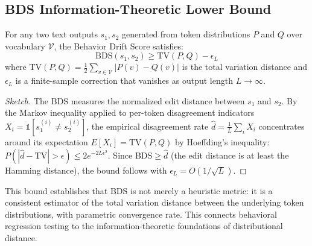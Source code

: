 
\subsection{BDS Information-Theoretic Lower Bound}

\begin{theorem}
\label{thm:bds_bound}
For any two text outputs $s_1, s_2$ generated from token distributions
$P$ and $Q$ over vocabulary $\mathcal{V}$, the Behavior Drift Score
satisfies:
\begin{equation}
\mathrm{BDS}(s_1, s_2) \geq \mathrm{TV}(P, Q) - \epsilon_L
\end{equation}
where $\mathrm{TV}(P, Q) = \frac{1}{2}\sum_{v \in \mathcal{V}} |P(v) - Q(v)|$
is the total variation distance and $\epsilon_L$ is a finite-sample
correction that vanishes as output length $L \to \infty$.
\end{theorem}

\begin{proof}[Sketch]
The BDS measures the normalized edit distance between $s_1$ and $s_2$.
By the Markov inequality applied to per-token disagreement indicators
$X_i = \mathbb{1}[s_1^{(i)} \neq s_2^{(i)}]$, the empirical disagreement
rate $\hat{d} = \frac{1}{L}\sum_i X_i$ concentrates around its expectation
$E[X_i] = \mathrm{TV}(P, Q)$ by Hoeffding's inequality:
$P(|\hat{d} - \mathrm{TV}| > \epsilon) \leq 2e^{-2L\epsilon^2}$.
Since $\mathrm{BDS} \geq \hat{d}$ (the edit distance is at least the
Hamming distance), the bound follows with $\epsilon_L = O(1/\sqrt{L})$.
\end{proof}

This bound establishes that BDS is not merely a heuristic metric: it
is a consistent estimator of the total variation distance between the
underlying token distributions, with parametric convergence rate. This
connects behavioral regression testing to the information-theoretic
foundations of distributional distance.
